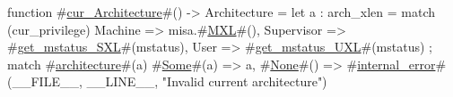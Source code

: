 function #\hyperref[sailRISCVzcurzyArchitecture]{cur\_Architecture}#() -> Architecture = {
  let a : arch_xlen =
    match (cur_privilege) {
      Machine    => misa.#\hyperref[sailRISCVzMXL]{MXL}#(),
      Supervisor => #\hyperref[sailRISCVzgetzymstatuszySXL]{get\_mstatus\_SXL}#(mstatus),
      User       => #\hyperref[sailRISCVzgetzymstatuszyUXL]{get\_mstatus\_UXL}#(mstatus)
    };
  match #\hyperref[sailRISCVzarchitecture]{architecture}#(a) {
    #\hyperref[sailRISCVzSome]{Some}#(a) => a,
    #\hyperref[sailRISCVzNone]{None}#()  => #\hyperref[sailRISCVzinternalzyerror]{internal\_error}#(__FILE__, __LINE__, "Invalid current architecture")
  }
}
